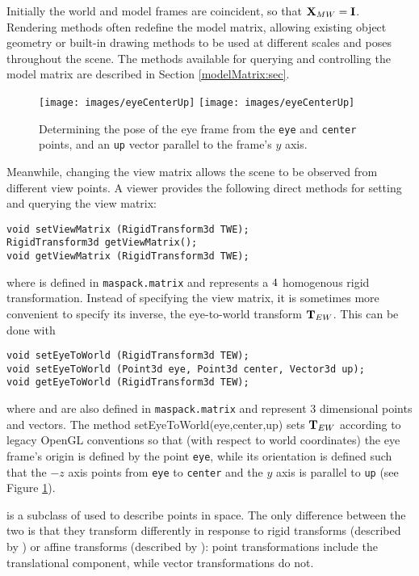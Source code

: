 Initially the world and model frames are coincident, so that ${\bf X}_{MW}
= {\bf I}$. Rendering methods often redefine the model matrix, allowing
existing object geometry or built-in drawing methods to be used at
different scales and poses throughout the scene.  The methods
available for querying and controlling the model matrix are described
in Section \ref{modelMatrix:sec}.

%
\begin{figure}[t]
\begin{center}
\iflatexml
 \texttt{[image: images/eyeCenterUp]}
\else
 \texttt{[image: images/eyeCenterUp]}
\fi
\end{center}
\caption{Determining the pose of the eye frame from the {\tt eye} and
{\tt center} points, and an {\tt up} vector parallel to the frame's
$y$ axis.}
\label{eyeCenterUp:fig}
\end{figure}
%
Meanwhile, changing the view matrix allows the scene to be
observed from different view points. A viewer provides the following
direct methods for setting and querying the view matrix:
%
\begin{lstlisting}[]
void setViewMatrix (RigidTransform3d TWE);
RigidTransform3d getViewMatrix();
void getViewMatrix (RigidTransform3d TWE);
\end{lstlisting}
%
where 
 is defined
in {\tt maspack.matrix} and represents a $4 \time 4$ homogenous
rigid transformation.
Instead of specifying the view matrix, it is sometimes more convenient
to specify its inverse, the eye-to-world transform ${\bf T}_{EW}$.
This can be done with
%
\begin{lstlisting}[]
void setEyeToWorld (RigidTransform3d TEW);
void setEyeToWorld (Point3d eye, Point3d center, Vector3d up);
void getEyeToWorld (RigidTransform3d TEW);
\end{lstlisting}
%
where 
 and
 are also defined in 
{\tt maspack.matrix} and represent 3 dimensional points and vectors.
The method
%
{setEyeToWorld(eye,center,up)} sets ${\bf T}_{EW}$ according to legacy
OpenGL conventions so that (with respect to world coordinates) the eye
frame's origin is defined by the point {\tt eye}, while its
orientation is defined such that the $-z$ axis points from {\tt eye}
to {\tt center} and the $y$ axis is parallel to {\tt up} (see Figure
\ref{eyeCenterUp:fig}).

\begin{sideblock}
 is a subclass of
 used to describe points in
space. The only difference between the two is that they transform
differently in response to rigid transforms (described by
) or affine transforms
(described by ): point
transformations include the translational component, while vector
transformations do not.
\end{sideblock}

